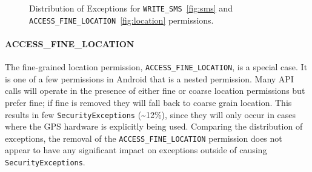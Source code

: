\begin{figure}[h!]
\hfill
\hfill
\hfill
\caption{Distribution of Exceptions for \texttt{WRITE\_SMS}~\ref{fig:sms} and \texttt{ACCESS\_FINE\_LOCATION}~\ref{fig:location} permissions.}
\end{figure}

\paragraph{\bfseries \ttfamily ACCESS\_FINE\_LOCATION}
The fine-grained location permission, \texttt{ACCESS\_FINE\_LOCATION}, is a special case. It is one of a few permissions in Android that is a nested permission. Many API calls will operate in the presence of either fine or coarse location permissions but prefer fine; if fine is removed they will fall back to coarse grain location. This results in few \texttt{SecurityExceptions} (\textasciitilde12\%), since they will only occur in cases where the GPS hardware is explicitly being used.  Comparing the distribution of exceptions, the removal of the \texttt{ACCESS\_FINE\_LOCATION} permission does not appear to have any significant impact on exceptions outside of causing \texttt{SecurityExceptions}.
